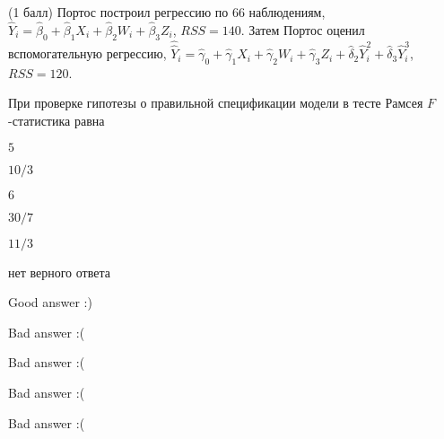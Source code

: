 
\begin{question}
(1 балл) Портос построил регрессию по 66 наблюдениям,
\(\hat Y_i = \hat\beta_0 + \hat\beta_1 X_i + \hat\beta_2 W_i + \hat\beta_3 Z_i\),
\(RSS=140\). Затем Портос оценил вспомогательную регрессию,
\(\hat{\hat {Y}}_i = \hat\gamma_0 + \hat\gamma_1 X_i + \hat\gamma_2 W_i + \hat\gamma_3 Z_i + \hat\delta_2 \hat Y_i^2 + \hat\delta_3 \hat Y_i^3\),
\(RSS=120\).

При проверке гипотезы о правильной спецификации модели в тесте Рамсея
\(F\)-статистика равна
\begin{answerlist}
  \item \(5\)
  \item \(10/3\)
  \item \(6\)
  \item \(30/7\)
  \item \(11/3\)
  \item нет верного ответа
\end{answerlist}
\end{question}

\begin{solution}
\begin{answerlist}
  \item Good answer :)
  \item Bad answer :(
  \item Bad answer :(
  \item Bad answer :(
  \item Bad answer :(
\end{answerlist}
\end{solution}
